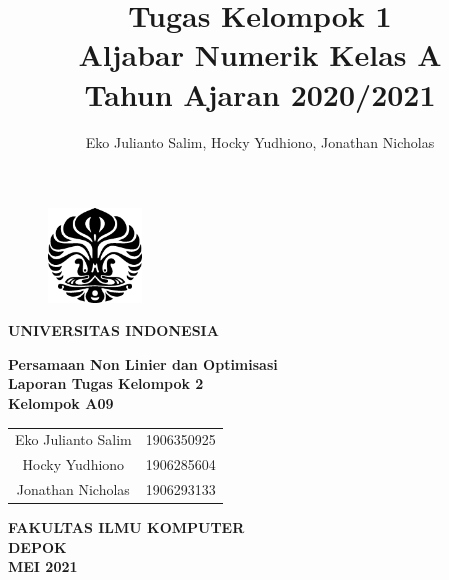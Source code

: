 \documentclass[11pt, a4paper, onecolumn, oneside, final]{report}
\title{Tugas Kelompok 1\\Aljabar Numerik Kelas A\\Tahun Ajaran 2020/2021}
\author{Eko Julianto Salim, Hocky Yudhiono, Jonathan Nicholas}
\begin{document}
\begin{titlepage}
    \begin{center}\begin{figure}
            \begin{center}
                \includegraphics[width=2.5cm]{makara.eps}
            \end{center}
        \end{figure}    
        \vspace*{0cm}
        \textbf{
        	UNIVERSITAS INDONESIA\\
        }
        
        \vspace*{1.0cm}
        \textbf{Persamaan Non Linier dan Optimisasi} \\[1.0cm]

        \vspace*{2.5 cm}    
        \textbf{Laporan Tugas Kelompok 2} \\
        
        \vspace*{3 cm}
        \textbf{Kelompok A09} \\
        
\begin{table}[H]
        \centering
        \begin{tabular}{c c}
            Eko Julianto Salim & 1906350925\\
            Hocky Yudhiono & 1906285604 \\
            Jonathan Nicholas & 1906293133\\
        \end{tabular}
        \end{table}
        \vspace*{5.0cm}

        \textbf{
        	FAKULTAS ILMU KOMPUTER\\
        	DEPOK \\
        	MEI 2021
        }
    \end{center}
\end{titlepage}
\end{document}

